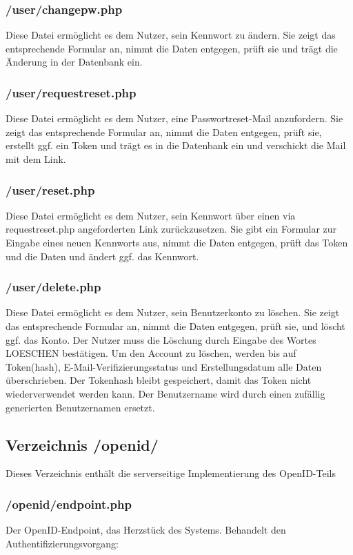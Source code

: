 \subsubsection{/user/changepw.php}
Diese Datei ermöglicht es dem Nutzer, sein Kennwort zu ändern.
Sie zeigt das entsprechende Formular an, nimmt die Daten entgegen, prüft sie und trägt die Änderung in der Datenbank ein.

\subsubsection{/user/requestreset.php}
Diese Datei ermöglicht es dem Nutzer, eine Passwortreset-Mail anzufordern.
Sie zeigt das entsprechende Formular an, nimmt die Daten entgegen, prüft sie, erstellt ggf. ein Token und trägt es in die Datenbank ein und verschickt die Mail mit dem Link.

\subsubsection{/user/reset.php}
Diese Datei ermöglicht es dem Nutzer, sein Kennwort über einen via requestreset.php angeforderten Link zurückzusetzen.
Sie gibt ein Formular zur Eingabe eines neuen Kennworts aus, nimmt die Daten entgegen, prüft das Token und die Daten und ändert ggf. das Kennwort.

\subsubsection{/user/delete.php}
Diese Datei ermöglicht es dem Nutzer, sein Benutzerkonto zu löschen.
Sie zeigt das entsprechende Formular an, nimmt die Daten entgegen, prüft sie, und löscht ggf. das Konto.
Der Nutzer muss die Löschung durch Eingabe des Wortes LOESCHEN bestätigen.
Um den Account zu löschen, werden bis auf Token(hash), E-Mail-Verifizierungsstatus und Erstellungsdatum alle Daten überschrieben.
Der Tokenhash bleibt gespeichert, damit das Token nicht wiederverwendet werden kann.
Der Benutzername wird durch einen zufällig generierten Benutzernamen ersetzt.

\subsection{Verzeichnis /openid/}
Dieses Verzeichnis enthält die serverseitige Implementierung des OpenID-Teils

\subsubsection{/openid/endpoint.php}
Der OpenID-Endpoint, das Herzstück des Systems.
Behandelt den Authentifizierungsvorgang:

